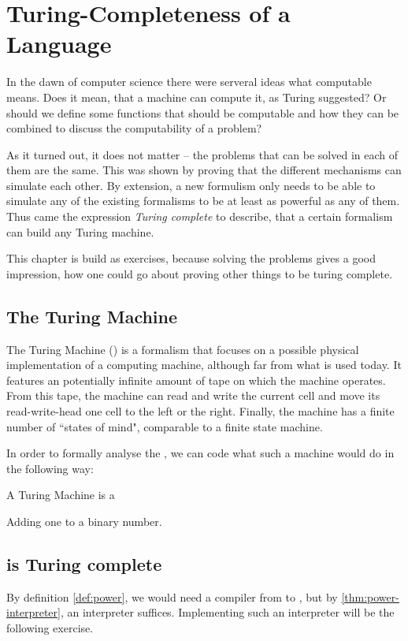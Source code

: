 \section{Turing-Completeness of a Language}
\label{sec:Turing Completeness}
In the dawn of computer science there were serveral ideas what computable 
means. Does it mean, that a machine can compute it, as Turing suggested? Or 
should we define some functions that should be computable and how they can be
combined to discuss the computability of a problem?

As it turned out, it does not matter -- the problems that can be solved in 
each of them are the same. This was shown by proving that the different 
mechanisms can simulate each other. By extension, a new formulism only needs 
to be able to simulate any of the existing formalisms to be at least as 
powerful as any of them. Thus came the expression {\em Turing complete} to 
describe, that a certain formalism can build any Turing machine.

This chapter is build as exercises, because solving the problems gives a good 
impression, how one could go about proving other things to be turing complete.

\subsection{The Turing Machine}
The Turing Machine (\TM) is a formalism that focuses on a possible physical 
implementation of a computing machine, although far from what is used today. 
It features an potentially infinite amount of tape on which the machine 
operates. From this tape, the machine can read and write the current cell and 
move its read-write-head one cell to the left or the right. Finally, the 
machine has a finite number of ``states of mind", comparable to a finite 
state machine.

In order to formally analyse the \TM, we can code what such a machine would 
do in the following way:

\begin{defn}
	\label{def:tm}
	A Turing Machine is a %
\end{defn}

\begin{example}
	Adding one to a binary number.
\end{example}

\subsection{\WHILE is Turing complete}
By definition \ref{def:power}, we would need a compiler from \TM to \WHILE, 
but by \ref{thm:power-interpreter}, an interpreter suffices. Implementing such an 
interpreter will be the following exercise.


